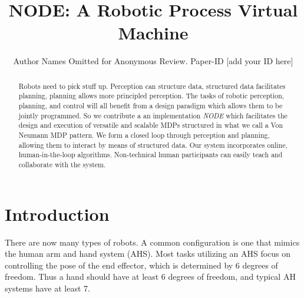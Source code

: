 \documentclass[conference]{IEEEtran}
\begin{document}


\title{NODE: A Robotic Process Virtual Machine}
\author{Author Names Omitted for Anonymous Review. Paper-ID [add your ID here]}

\maketitle


\begin{abstract}
Robots need to pick stuff up.
%
Perception can structure data, structured data facilitates planning, planning allows more principled perception.
%
The tasks of robotic perception, planning, and control will all benefit from
a design paradigm which allows them to be jointly programmed.
%
So we contribute a an implementation \emph{NODE} which facilitates the design and 
execution of versatile and scalable MDPs structured in what we call a
Von Neumann MDP pattern. 
%
We form a closed loop through perception and planning, allowing them to interact by means of structured data.
%
Our system incorporates online, human-in-the-loop algorithms. Non-technical human participants can easily
teach and collaborate with the system.
\end{abstract}


\section{Introduction}


There are now many types of robots. A common configuration is one that mimics
the human arm and hand system (AHS).  Most tasks utilizing an AHS focus on controlling the
pose of the end effector, which is determined by 6 degrees of freedom.  Thus a hand should have 
at least 6 degrees of freedom, and typical AH systems have at least 7.
\end{document}
